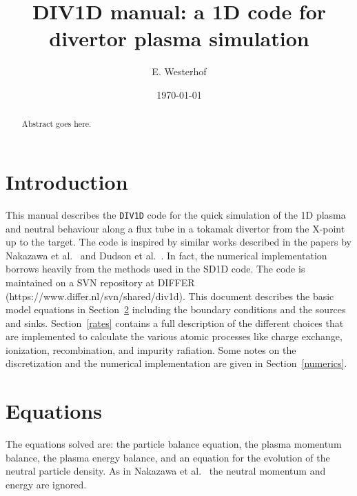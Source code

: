 \documentclass[amsmath,amssymb,a4]{revtex4-2}
\begin{document}
\title[DIV1D manual]{DIV1D manual: a 1D code for divertor plasma simulation}

\author{E. Westerhof}

\address{DIFFER -- Dutch Institute for Fundamental Energy Research, PO Box 6336, 5600HH Eindhoven, The Netherlands, www.differ.nl}

\vspace{10pt}
\date\today


\begin{abstract}
Abstract goes here.
\end{abstract}


\maketitle

\section{Introduction}

This manual describes the {\tt DIV1D} code for the quick simulation of the 1D plasma and neutral behaviour along a flux tube in a tokamak divertor from the X-point up to the target. The code is inspired by similar works described in the papers by Nakazawa et al.~\cite{nakazawa2000} and Dudson et al.~\cite{dudson2019, SD1D}. In fact, the numerical implementation borrows heavily from the methods used in the SD1D code. The code is maintained on a SVN repository at DIFFER (https://www.differ.nl/svn/shared/div1d). This document describes the basic model equations in Section~\ref{basic_equations} including the boundary conditions and the sources and sinks. Section~\ref{rates} contains a full description of the different choices that are implemented to calculate the various atomic processes like charge exchange, ionization, recombination, and impurity rafiation. Some notes on the discretization and the numerical implementation are given in Section~\ref{numerics}.


\section{Equations}\label{basic_equations}

The equations solved are: the particle balance equation, the plasma momentum balance, the plasma energy balance, and an equation for the evolution of the neutral particle density. As in Nakazawa et al.~\cite{nakazawa2000} the neutral momentum and energy are ignored.
\end{document}
